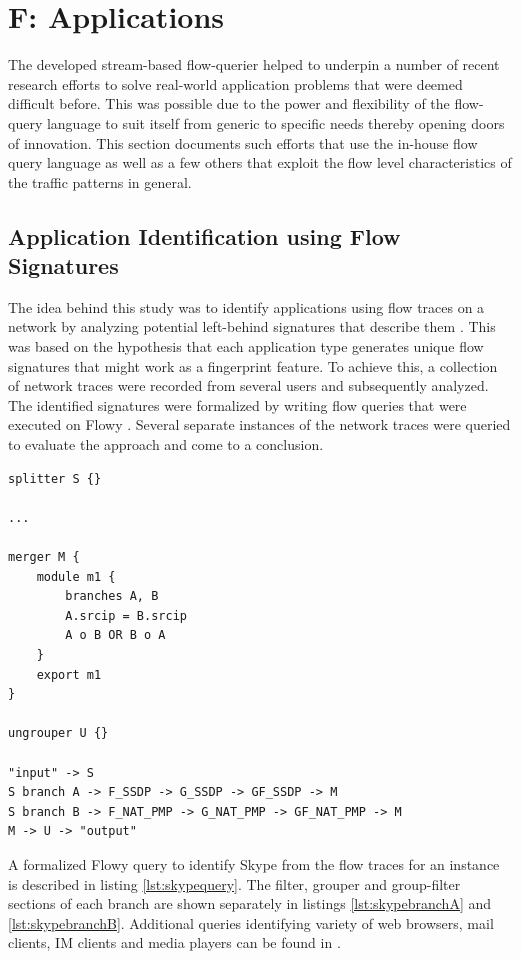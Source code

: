 \chapter{F: Applications}\label{ch:flowy-applications}

The developed stream-based flow-querier helped to underpin a number of recent research efforts to solve real-world application problems that were deemed difficult before. This was possible due to the power and flexibility of the flow-query language to suit itself from generic to specific needs thereby opening doors of innovation. This section documents such efforts that use the in-house flow query language as well as a few others that exploit the flow level characteristics of the traffic patterns in general.

\section{Application Identification using Flow
Signatures}\label{sec:application-signatures}
The idea behind this study was to identify applications using flow traces on a network by analyzing potential left-behind signatures that describe them \cite{vperelman:2011, vperelman:thesis:2010}. This was based on the hypothesis that each application type generates unique flow signatures that might work as a fingerprint feature. To achieve this, a collection of network traces were recorded from several users and subsequently analyzed. The identified signatures were formalized by writing flow queries that were executed on Flowy \cite{kkanev:2010}. Several separate instances of the network traces were queried to evaluate the approach and come to a conclusion.

\begin{lstlisting}
splitter S {}

...

merger M {
	module m1 {
		branches A, B
		A.srcip = B.srcip
		A o B OR B o A
	}
	export m1
}

ungrouper U {}

"input" -> S
S branch A -> F_SSDP -> G_SSDP -> GF_SSDP -> M
S branch B -> F_NAT_PMP -> G_NAT_PMP -> GF_NAT_PMP -> M
M -> U -> "output"
\end{lstlisting}
A formalized Flowy query to identify Skype from the flow traces for an instance is described in listing \ref{lst:skypequery}. The filter, grouper and group-filter sections of each branch are shown separately in listings \ref{lst:skypebranchA} and \ref{lst:skypebranchB}. Additional queries identifying variety of web browsers, mail clients, IM clients and media players can be found in \cite{vperelman:thesis:2010}.

